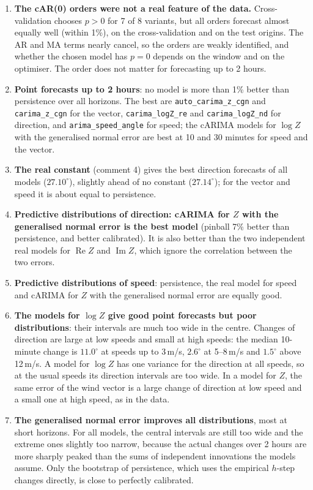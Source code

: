 \documentclass[11pt,a4paper]{article}
\newcommand{\code}[1]{\texttt{#1}}
\newcommand{\1}{\mathbf{1}}
\renewcommand{\Re}{\operatorname{Re}}
\renewcommand{\Im}{\operatorname{Im}}
\begin{document}
\begin{enumerate}
  \item \textbf{The cAR(0) orders were not a real feature of the data.} Cross-validation chooses
    $p > 0$ for 7 of 8 variants, but all orders forecast almost equally well (within 1\%), on the
    cross-validation and on the test origins. The AR and MA terms nearly cancel, so the orders are
    weakly identified, and whether the chosen model has $p = 0$ depends on the window and on the
    optimiser. The order does not matter for forecasting up to 2 hours.
  \item \textbf{Point forecasts up to 2 hours}: no model is more than 1\% better than persistence
    over all horizons. The best are \code{auto\_carima\_z\_cgn} and \code{carima\_z\_cgn} for the
    vector, \code{carima\_logZ\_re} and \code{carima\_logZ\_nd} for direction, and
    \code{arima\_speed\_angle} for speed; the cARIMA models for $\log Z$ with the generalised normal
    error are best at 10 and 30 minutes for speed and the vector.
  \item \textbf{The real constant} (comment 4) gives the best direction forecasts of all models
    ($27.10^\circ$), slightly ahead of no constant ($27.14^\circ$); for the vector and speed it is
    about equal to persistence.
  \item \textbf{Predictive distributions of direction: cARIMA for $Z$ with the generalised normal
    error is the best model} (pinball 7\% better than persistence, and better calibrated). It is
    also better than the two independent real models for $\Re Z$ and $\Im Z$, which ignore the
    correlation between the two errors.
  \item \textbf{Predictive distributions of speed}: persistence, the real model for speed and
    cARIMA for $Z$ with the generalised normal error are equally good.
  \item \textbf{The models for $\log Z$ give good point forecasts but poor distributions}: their
    intervals are much too wide in the centre. Changes of direction are large at low speeds and
    small at high speeds: the median 10-minute change is $11.0^\circ$ at speeds up to 3\,m/s,
    $2.6^\circ$ at 5--8\,m/s and $1.5^\circ$ above 12\,m/s. A model for $\log Z$ has one variance for
    the direction at all speeds, so at the usual speeds its direction intervals are too wide. In a
    model for $Z$, the same error of the wind vector is a large change of direction at low speed and
    a small one at high speed, as in the data.
  \item \textbf{The generalised normal error improves all distributions}, most at short
    horizons. For all models, the central intervals are still too wide and the extreme ones
    slightly too narrow, because the actual changes over 2 hours are more sharply peaked than the
    sums of independent innovations the models assume. Only the bootstrap of persistence, which uses
    the empirical $h$-step changes directly, is close to perfectly calibrated.
\end{enumerate}
\end{document}
